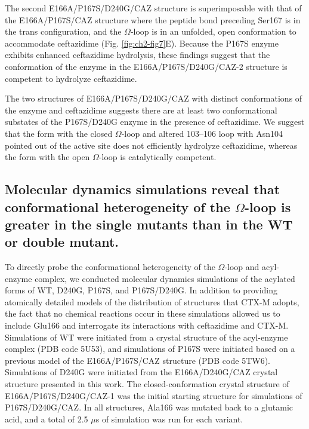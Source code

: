 \documentclass[../main.tex]{subfiles}
\begin{document}
        The second E166A/P167S/D240G/CAZ structure is superimposable with that of the E166A/P167S/CAZ structure where the peptide bond preceding Ser167 is in the trans configuration, and the $\Omega$-loop is in an unfolded, open conformation to accommodate ceftazidime (Fig. \ref{fig:ch2-fig7}E). Because the P167S enzyme exhibits enhanced ceftazidime hydrolysis, these findings suggest that the conformation of the enzyme in the E166A/P167S/D240G/CAZ-2 structure is competent to hydrolyze ceftazidime.

        The two structures of E166A/P167S/D240G/CAZ with distinct conformations of the enzyme and ceftazidime suggests there are at least two conformational substates of the P167S/D240G enzyme in the presence of ceftazidime. We suggest that the form with the closed $\Omega$-loop and altered 103–106 loop with Asn104 pointed out of the active site does not efficiently hydrolyze ceftazidime, whereas the form with the open $\Omega$-loop is catalytically competent.

    \subsection{Molecular dynamics simulations reveal that conformational heterogeneity of the $\Omega$-loop is greater in the single mutants than in the WT or double mutant.}

        To directly probe the conformational heterogeneity of the $\Omega$-loop and acyl-enzyme complex, we conducted molecular dynamics simulations of the acylated forms of WT, D240G, P167S, and P167S/D240G. In addition to providing atomically detailed models of the distribution of structures that CTX-M adopts, the fact that no chemical reactions occur in these simulations allowed us to include Glu166 and interrogate its interactions with ceftazidime and CTX-M. Simulations of WT were initiated from a crystal structure of the acyl-enzyme complex (PDB code 5U53)\cite{patel_drug-resistant_2017}, and simulations of P167S were initiated based on a previous model of the E166A/P167S/CAZ structure (PDB code 5TW6)\cite{patel_drug-resistant_2017}. Simulations of D240G were initiated from the E166A/D240G/CAZ crystal structure presented in this work. The closed-conformation crystal structure of E166A/P167S/D240G/CAZ-1 was the initial starting structure for simulations of P167S/D240G/CAZ. In all structures, Ala166 was mutated back to a glutamic acid, and a total of 2.5 $\mu$s of simulation was run for each variant.
\end{document}
